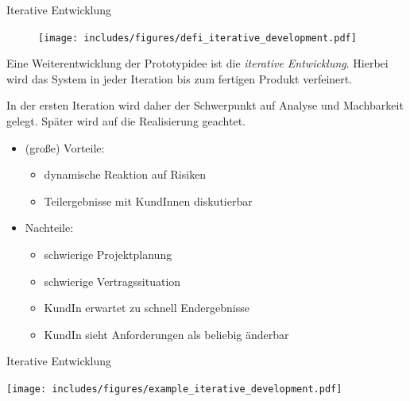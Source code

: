 \begin{defi}{Iterative Entwicklung}
    \begin{figure}
        \centering
        \texttt{[image: includes/figures/defi\_iterative\_development.pdf]}
    \end{figure}

    Eine Weiterentwicklung der Prototypidee ist die \emph{iterative Entwicklung}.
    Hierbei wird das System in jeder Iteration bis zum fertigen Produkt verfeinert.

    In der ersten Iteration wird daher der Schwerpunkt auf Analyse und Machbarkeit gelegt.
    Später wird auf die Realisierung geachtet.

    \begin{itemize}
        \item (große) Vorteile:
              \begin{itemize}
                  \item dynamische Reaktion auf Risiken
                  \item Teilergebnisse mit KundInnen diskutierbar
              \end{itemize}
        \item Nachteile:
              \begin{itemize}
                  \item schwierige Projektplanung
                  \item schwierige Vertragssituation
                  \item KundIn erwartet zu schnell Endergebnisse
                  \item KundIn sieht Anforderungen als beliebig änderbar
              \end{itemize}
    \end{itemize}
\end{defi}

\begin{example}{Iterative Entwicklung}
    \begin{center}
        \texttt{[image: includes/figures/example\_iterative\_development.pdf]}
    \end{center}
\end{example}


